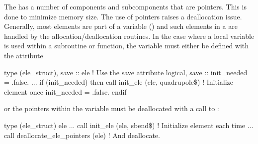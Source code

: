 The  has a number of components and subcomponents that are pointers. This is done to
minimize memory size. The use of pointers raises a deallocation issue.  Generally, most 
elements are part of a  variable () and such elements in a
 are handled by the  allocation/deallocation routines.  In the case
where a local  variable is used within a subroutine or function, the 
variable must either be defined with the  attribute
\begin{example}
  type (ele_struct), save :: ele          ! Use the save attribute
  logical, save :: init_needed = .false.
  ...
  if (init_needed) then
    call init_ele (ele, quadrupole\$)     ! Initialize element once
    init_needed = .false.
  endif
\end{example}
or the pointers within the variable must be deallocated  with a call to
:
\begin{example}
  type (ele_struct) ele  
  ...
  call init_ele (ele, sbend\$)            ! Initialize element each time
  ...
  call deallocate_ele_pointers (ele)     ! And deallocate.
\end{example}

